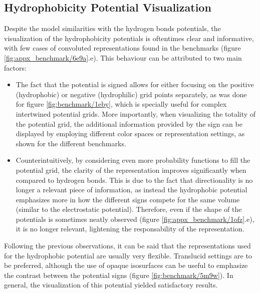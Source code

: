   \subsection{Hydrophobicity Potential Visualization}
    Despite the model similarities with the hydrogen bonds potentials, the visualization of the hydrophobicity potentials is oftentimes clear and informative, with few cases of convoluted representations found in the benchmarks (figure \ref{fig:appx_benchmark/6e9a}.e). This behaviour can be attributed to two main factors:

    \begin{itemize}
      \item The fact that the potential is signed allows for either focusing on the positive (hydrophobic) or negative (hydrophilic) grid points separately, as was done for figure \ref{fig:benchmark/1eby}, which is specially useful for complex intertwined potential grids. More importantly, when visualizing the totality of the potential grid, the additional information provided by the sign can be displayed by employing different color spaces or representation settings, as shown for the different benchmarks.

      \item Counterintuitively, by considering even more probability functions to fill the potential grid, the clarity of the representation improves significantly when compared to hydrogen bonds. This is due to the fact that directionality is no longer a relevant piece of information, as instead the hydrophobic potential emphasizes more in how the different signs compete for the same volume (similar to the electrostatic potential). Therefore, even if the shape of the potentials is sometimes neatly observed (figure \ref{fig:appx_benchmark/1ofz}.e), it is no longer relevant, lightening the responsability of the representation.
    \end{itemize}

    Following the previous observations, it can be said that the representations used for the hydrophobic potential are usually very flexible. Translucid settings are to be preferred, although the use of opaque isosurfaces can be useful to emphasize the contrast between the potential signs (figure \ref{fig:benchmark/5m9w}). In general, the visualization of this potential yielded satisfactory results.


